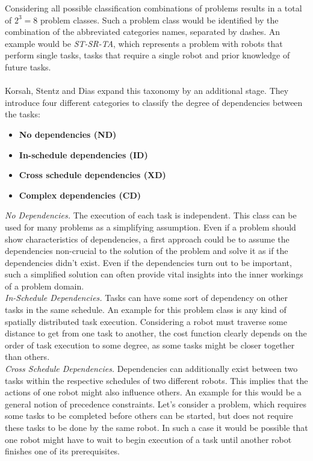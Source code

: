 Considering all possible classification combinations of problems results in a total of $2^3 = 8$ problem classes. Such a problem class would be identified by the combination of the abbreviated categories names, separated by dashes. An example would be \textit{ST-SR-TA}, which represents a problem with robots that perform single tasks, tasks that require a single robot and prior knowledge of future tasks.\\ \\
%
%
Korsah, Stentz and Dias \cite{korsah_comprehensive_2013} expand this taxonomy by an additional stage. They introduce four different categories to classify the degree of dependencies between the tasks:
\begin{itemize}
\item \textbf{No dependencies (ND)}
\item \textbf{In-schedule dependencies (ID)}
\item \textbf{Cross schedule dependencies (XD)}
\item \textbf{Complex dependencies (CD)}
\end{itemize}
\textit{No Dependencies.} The execution of each task is independent. This class can be used for many problems as a simplifying assumption. Even if a problem should show characteristics of dependencies, a first approach could be to assume the dependencies non-crucial to the solution of the problem and solve it as if the dependencies didn't exist. Even if the dependencies turn out to be important, such a simplified solution can often provide vital insights into the inner workings of a problem domain.\\%
\textit{In-Schedule Dependencies.} Tasks can have some sort of dependency on other tasks in the same schedule. An example for this problem class is any kind of spatially distributed task execution. Considering a robot must traverse some distance to get from one task to another, the cost function clearly depends on the order of task execution to some degree, as some tasks might be closer together than others.\\
\textit{Cross Schedule Dependencies.} Dependencies can additionally exist between two tasks within the respective schedules of two different robots. This implies that the actions of one robot might also influence others. An example for this would be a general notion of precedence constraints. Let's consider a problem, which requires some tasks to be completed before others can be started, but does not require these tasks to be done by the same robot. In such a case it would be possible that one robot might have to wait to begin execution of a task until another robot finishes one of its prerequisites.\\ 
